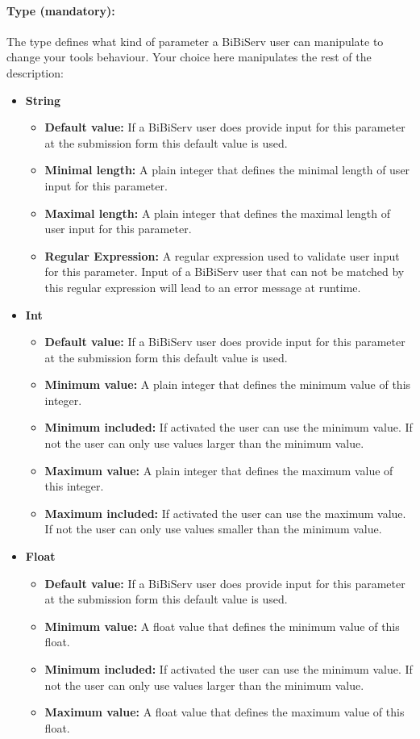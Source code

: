 \documentclass[a4paper,10pt]{book}
\newcommand{\defaultValue}{\textbf{Default value:} If a BiBiServ user does provide input for this parameter at the submission form this default value is used.}
\begin{document}
\paragraph{Type (mandatory):} The type defines what kind of parameter a BiBiServ user can manipulate to change your tools behaviour. Your choice here manipulates the rest of the description:
\begin{itemize}
 \item \textbf{String}
	\begin{itemize}
	\item \defaultValue
	\item \textbf{Minimal length:} A plain integer that defines the minimal length of user input for this parameter.
	\item \textbf{Maximal length:} A plain integer that defines the maximal length of user input for this parameter.
	\item \textbf{Regular Expression:} A regular expression used to validate user input for this parameter. Input of a BiBiServ user that can not be matched by this regular expression will lead to an error message at runtime.
	\end{itemize}
 \item \textbf{Int}
	\begin{itemize}
	\item \defaultValue
	\item \textbf{Minimum value:} A plain integer that defines the minimum value of this integer.
	\item \textbf{Minimum included:} If activated the user can use the minimum value. If not the user can only use values larger than the minimum value.
	\item \textbf{Maximum value:} A plain integer that defines the maximum value of this integer.
	\item \textbf{Maximum included:} If activated the user can use the maximum value. If not the user can only use values smaller than the minimum value.
	\end{itemize}
 \item \textbf{Float}
	\begin{itemize}
	\item \defaultValue
	\item \textbf{Minimum value:} A float value that defines the minimum value of this float.
	\item \textbf{Minimum included:} If activated the user can use the minimum value. If not the user can only use values larger than the minimum value.
	\item \textbf{Maximum value:} A float value that defines the maximum value of this float.

\end{itemize}
\end{itemize}
\end{document}
